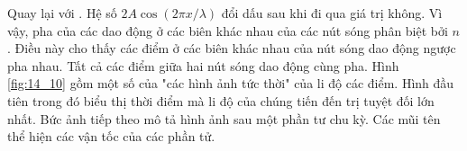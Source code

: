 Quay lại với . Hệ số $2A\cos(2\pi x/\lambda)$ đổi dấu sau khi đi qua giá trị không. Vì vậy, pha của các dao động ở các biên khác nhau của các nút sóng phân biệt bởi $n$. Điều này cho thấy các điểm ở các biên khác nhau của nút sóng dao động ngược pha nhau. Tất cả các điểm giữa hai nút sóng dao động cùng pha. Hình \ref{fig:14_10} gồm một số của "các hình ảnh tức thời" của li độ các điểm. Hình đầu tiên trong đó biểu thị thời điểm mà li độ của chúng tiến đến trị tuyệt đối lớn nhất. Bức ảnh tiếp theo mô tả hình ảnh sau một phần tư chu kỳ. Các mũi tên thể hiện các vận tốc của các phần tử.
